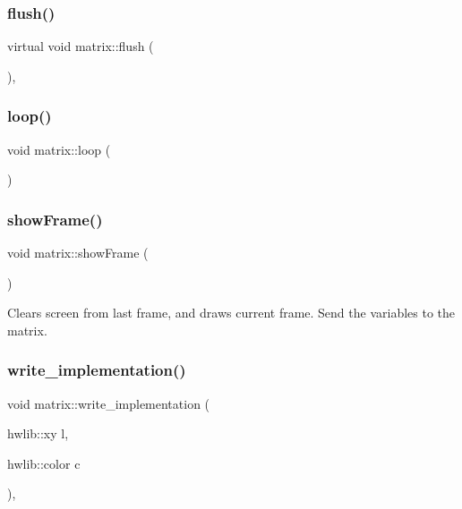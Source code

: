 \mbox{\label{classmatrix_a867830c5b26171d0b031aadeb8ad1eee}} 
\subsubsection{\texorpdfstring{flush()}{flush()}}
{\footnotesize\ttfamily virtual void matrix\+::flush (\begin{DoxyParamCaption}{ }\end{DoxyParamCaption})\hspace{0.3cm}{\ttfamily [inline]}, {\ttfamily [virtual]}}

\mbox{\label{classmatrix_a6d2edd1ca96668aed4dfa402fb558d8c}} 
\subsubsection{\texorpdfstring{loop()}{loop()}}
{\footnotesize\ttfamily void matrix\+::loop (\begin{DoxyParamCaption}{ }\end{DoxyParamCaption})}

\mbox{\label{classmatrix_a78bca859b321539d1749b0d3ef8c11c5}} 
\subsubsection{\texorpdfstring{show\+Frame()}{showFrame()}}
{\footnotesize\ttfamily void matrix\+::show\+Frame (\begin{DoxyParamCaption}{ }\end{DoxyParamCaption})}



Clears screen from last frame, and draws current frame. Send the variables to the matrix. 

\mbox{\label{classmatrix_a81034d9b2d1b26438be9861e837a962b}} 
\subsubsection{\texorpdfstring{write\+\_\+implementation()}{write\_implementation()}}
{\footnotesize\ttfamily void matrix\+::write\+\_\+implementation (\begin{DoxyParamCaption}\item[{hwlib\+::xy}]{l,  }\item[{hwlib\+::color}]{c }\end{DoxyParamCaption})\hspace{0.3cm}{\ttfamily [private]}, {\ttfamily [virtual]}}



